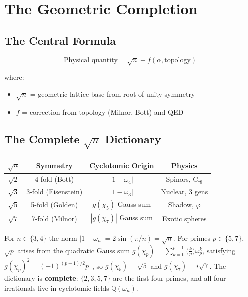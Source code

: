 \documentclass[aps,prd,twocolumn,superscriptaddress,floatfix,nofootinbib]{revtex4-2}
\theoremstyle{definition}
\theoremstyle{remark}
\begin{document}
\section{The Geometric Completion}

\subsection{The Central Formula}

\begin{equation}
\text{Physical quantity} = \sqrt{n} + f(\alpha, \text{topology})
\end{equation}

where:
\begin{itemize}
\item $\sqrt{n}$ = geometric lattice base from root-of-unity symmetry
\item $f$ = correction from topology (Milnor, Bott) and QED
\end{itemize}

\subsection{The Complete $\sqrt{n}$ Dictionary}

\begin{center}
\begin{tabular}{cccc}
\toprule
$\sqrt{n}$ & Symmetry & Cyclotomic Origin & Physics \\
\midrule
$\sqrt{2}$ & 4-fold (Bott) & $|1 - \omega_4|$ & Spinors, Cl$_8$ \\
$\sqrt{3}$ & 3-fold (Eisenstein) & $|1 - \omega_3|$ & Nuclear, 3 gens \\
$\sqrt{5}$ & 5-fold (Golden) & $g(\chi_5)$ Gauss sum & Shadow, $\varphi$ \\
$\sqrt{7}$ & 7-fold (Milnor) & $|g(\chi_7)|$ Gauss sum & Exotic spheres \\
\bottomrule
\end{tabular}
\end{center}

\noindent For $n \in \{3,4\}$ the norm $|1-\omega_n| = 2\sin(\pi/n) = \sqrt{n}$.
For primes $p \in \{5,7\}$, $\sqrt{p}$ arises from the quadratic Gauss sum
$g(\chi_p) = \sum_{k=0}^{p-1} \bigl(\frac{k}{p}\bigr)\omega_p^k$,
satisfying $g(\chi_p)^2 = (-1)^{(p-1)/2}p$~\cite{Gauss1801},
so $g(\chi_5) = \sqrt{5}$ and $g(\chi_7) = i\sqrt{7}$.
The dictionary is \textbf{complete}: $\{2, 3, 5, 7\}$ are the first four primes,
and all four irrationals live in cyclotomic fields $\mathbb{Q}(\omega_n)$.
\end{document}
